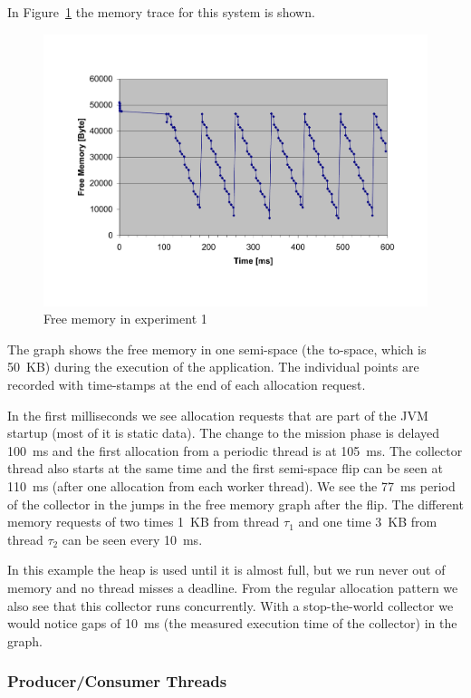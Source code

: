 In Figure~\ref{fig:ex1:mem} the memory trace for this system is
shown.
\begin{figure}
\begin{center}
    \includegraphics[width=\excelwidth]{jvm/gc_ex1}
    \caption{Free memory in experiment 1}
\label{fig:ex1:mem}
\end{center}
\end{figure}
The graph shows the free memory in one semi-space (the to-space,
which is 50~KB) during the execution of the application. The
individual points are recorded with time-stamps at the end of each
allocation request.

In the first milliseconds we see allocation requests that are part
of the JVM startup (most of it is static data). The change to the
mission phase is delayed 100~ms and the first allocation from a
periodic thread is at 105~ms. The collector thread also starts at
the same time and the first semi-space flip can be seen at 110~ms
(after one allocation from each worker thread). We see the 77~ms
period of the collector in the jumps in the free memory graph after
the flip. The different memory requests of two times 1~KB from
thread $\tau_1$ and one time 3~KB from thread $\tau_2$ can be seen
every 10~ms.

In this example the heap is used until it is almost full, but we run
never out of memory and no thread misses a deadline. From the
regular allocation pattern we also see that this collector runs
concurrently. With a stop-the-world collector we would notice gaps
of 10~ms (the measured execution time of the collector) in the
graph.

\subsubsection{Producer/Consumer Threads}


